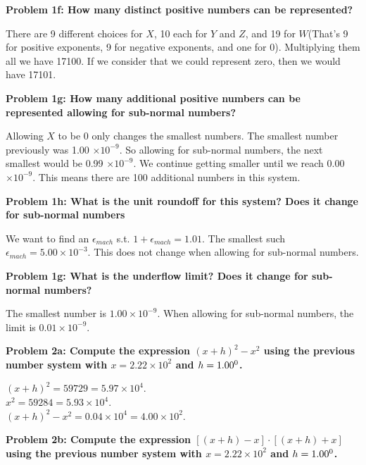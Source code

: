 \documentclass[11pt]{article}
\numberwithin{equation}{section}  %
\begin{document}
\noindent\textbf{Problem 1f: How many distinct positive numbers can be represented?}

\noindent There are 9 different choices for $X$, 10 each for $Y$ and $Z$, and 19 for $W$(That's 9 for positive exponents, 9 for negative exponents, and one for 0). Multiplying them all we have 17100. If we consider that we could represent zero, then we would have 17101.
\vspace*{0.25in}

\noindent\textbf{Problem 1g: How many additional positive numbers can be represented allowing for sub-normal numbers?}

\noindent Allowing $X$ to be 0 only changes the smallest numbers. The smallest number previously was 1.00 $\times 10^{-9}$. So allowing for sub-normal numbers, the next smallest would be 0.99 $\times 10^{-9}$. We continue getting smaller until we reach 0.00 $\times 10^{-9}$. This means there are 100 additional numbers in this system.
\vspace*{0.25in}

\noindent\textbf{Problem 1h: What is the unit roundoff for this system? Does it change for sub-normal numbers}

\noindent We want to find an $\epsilon_{mach}$ s.t. $1+\epsilon_{mach}=1.01$. The smallest such $\epsilon_{mach}=5.00 \times 10^{-3}$. This does not change when allowing for sub-normal numbers.
\vspace*{0.25in}

\noindent\textbf{Problem 1g: What is the underflow limit? Does it change for sub-normal numbers?}

\noindent The smallest number is $1.00 \times 10^{-9}$. When allowing for sub-normal numbers, the limit is $0.01 \times 10^{-9}$.
\vspace*{0.25in}

\noindent\textbf{Problem 2a: Compute the expression $(x+h)^2 - x^2$ using the previous number system with $x=2.22 \times 10^{2}$ and $h=1.00 \time 10^{0}$.}

\noindent $(x+h)^2 = 59729 = 5.97 \times 10^{4}$.\\
$x^2 = 59284 = 5.93 \times 10^{4}$.\\
$(x+h)^2 - x^2 = 0.04 \times 10^{4} = 4.00 \times 10^2$.

\vspace*{0.25in}

\noindent\textbf{Problem 2b: Compute the expression $[(x+h) - x] \cdot [(x+h) + x]$ using the previous number system with $x=2.22 \times 10^{2}$ and $h=1.00 \time 10^{0}$.}
\end{document}
